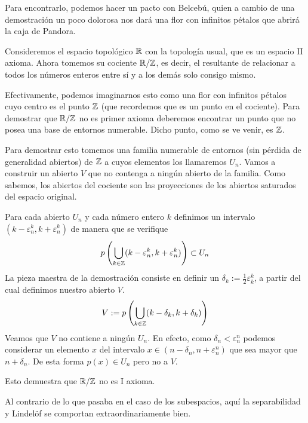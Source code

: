 Para encontrarlo, podemos hacer un pacto con Belcebú, quien a cambio de una demostración un poco dolorosa nos dará una flor con infinitos pétalos que abrirá la caja de Pandora.
\begin{exa}
	Consideremos el espacio topológico $\mathbb{R}$ con la topología usual, que es un espacio II axioma. Ahora tomemos su cociente $\mathbb{R}/\mathbb{Z}$, es decir, el resultante de relacionar a todos los números enteros entre sí y a los demás solo consigo mismo.
	
	Efectivamente, podemos imaginarnos esto como una flor con infinitos pétalos cuyo centro es el punto $\mathbb{Z}$ (que recordemos que es un punto en el cociente). Para demostrar que $\mathbb{R}/\mathbb{Z}$ no es primer axioma deberemos encontrar un punto que no posea una base de entornos numerable. Dicho punto, como se ve venir, es $\mathbb{Z}$.
	
	Para demostrar esto tomemos una familia numerable de entornos (sin pérdida de generalidad abiertos) de $\mathbb{Z}$ a cuyos elementos los llamaremos $U_n$. Vamos a construir un abierto $V$ que no contenga a ningún abierto de la familia. Como sabemos, los abiertos del cociente son las proyecciones de los abiertos saturados del espacio original.
	
	Para cada abierto $U_n$ y cada número entero $k$ definimos un intervalo $(k-\varepsilon_n^k,k+\varepsilon_n^k)$ de manera que se verifique
	\begin{equation*}
		p\left(\bigcup_{k\in\mathbb{Z}}(k-\varepsilon_n^k,k+\varepsilon_n^k)\right)\subset U_n
	\end{equation*}
	La pieza maestra de la demostración consiste en definir un $\delta_k:=\frac{1}{2}\varepsilon_k^k$, a partir del cual definimos nuestro abierto $V$.
	\begin{equation*}
		V:=p\left(\bigcup_{k\in\mathbb{Z}}(k-\delta_k,k+\delta_k)\right)
	\end{equation*}
	Veamos que $V$ no contiene a ningún $U_n$. En efecto, como $\delta_n<\varepsilon_n^n$ podemos considerar un elemento $x$ del intervalo $x\in(n-\delta_n,n+\varepsilon_n^n)$ que sea mayor que $n+\delta_n$. De esta forma $p(x)\in U_n$ pero no a $V$.
	
	Esto demuestra que $\mathbb{R}/\mathbb{Z}$ no es I axioma.
\end{exa}
Al contrario de lo que pasaba en el caso de los subespacios, aquí la separabilidad y Lindelöf se comportan extraordinariamente bien.

